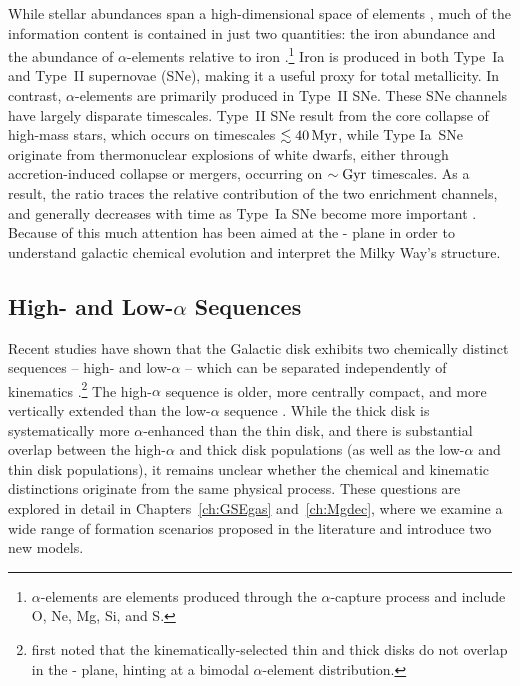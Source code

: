 While stellar abundances span a high-dimensional space of elements \citep[e.g., 32 elements in][]{2024ApJ...961L..41J}, much of the information content is contained in just two quantities: the iron abundance \FeH{} and the abundance of $\alpha$-elements relative to iron \alphaFe{}.\footnote{$\alpha$-elements are elements produced through the $\alpha$-capture process and include O, Ne, Mg, Si, and S.} Iron is produced in both Type~Ia and Type~II supernovae (SNe), making it a useful proxy for total metallicity. In contrast, $\alpha$-elements are primarily produced in Type~II SNe. These SNe channels have largely disparate timescales. Type~II SNe result from the core collapse of high-mass stars, which occurs on timescales $\lesssim40\,\textrm{Myr}$, while Type Ia~SNe originate from thermonuclear explosions of white dwarfs, either through accretion-induced collapse or mergers, occurring on $\sim\textrm{Gyr}$ timescales. As a result, the ratio \alphaFe{} traces the relative contribution of the two enrichment channels, and generally decreases with time as Type~Ia SNe become more important \citep{1979ApJ...229.1046T}. Because of this much attention has been aimed at the \alphaFe{}-\FeH{} plane in order to understand galactic chemical evolution and interpret the Milky Way's structure.

\subsection{High- and Low-\texorpdfstring{$\alpha$}{α} Sequences}
Recent studies have shown that the Galactic disk exhibits two chemically distinct sequences -- high- and low-$\alpha$ -- which can be separated independently of kinematics \citep{2011A&A...535L..11A,2012A&A...545A..32A}.\footnote{\citet{2003A&A...410..527B} first noted that the kinematically-selected thin and thick disks do not overlap in the \alphaFe{}-\FeH{} plane, hinting at a bimodal $\alpha$-element distribution.} The high-$\alpha$ sequence is older, more centrally compact, and more vertically extended than the low-$\alpha$ sequence \citep{2013A&A...560A.109H, 2024IAUS..377..115N}. While the thick disk is systematically more $\alpha$-enhanced than the thin disk, and there is substantial overlap between the high-$\alpha$ and thick disk populations (as well as the low-$\alpha$ and thin disk populations), it remains unclear whether the chemical and kinematic distinctions originate from the same physical process. These questions are explored in detail in Chapters~\ref{ch:GSEgas} and~\ref{ch:Mgdec}, where we examine a wide range of formation scenarios proposed in the literature and introduce two new models.

